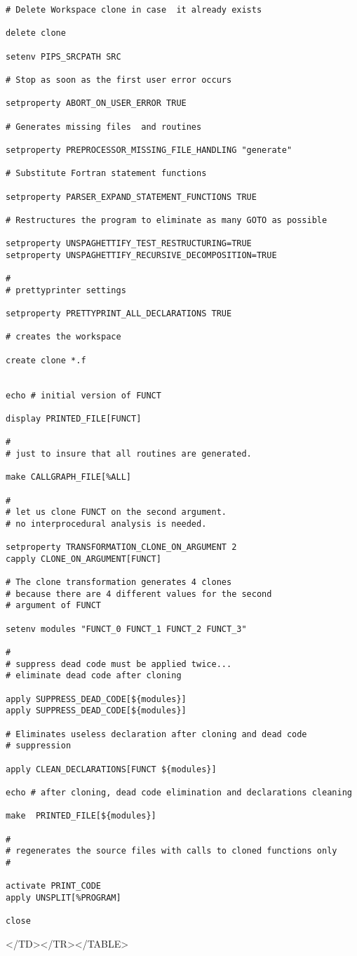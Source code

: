 \documentclass[a4paper,12pt]{article}
\begin{document}
{\bf
\begin{verbatim}
# Delete Workspace clone in case  it already exists

delete clone                      

setenv PIPS_SRCPATH SRC

# Stop as soon as the first user error occurs

setproperty ABORT_ON_USER_ERROR TRUE   

# Generates missing files  and routines 

setproperty PREPROCESSOR_MISSING_FILE_HANDLING "generate" 

# Substitute Fortran statement functions

setproperty PARSER_EXPAND_STATEMENT_FUNCTIONS TRUE

# Restructures the program to eliminate as many GOTO as possible

setproperty UNSPAGHETTIFY_TEST_RESTRUCTURING=TRUE
setproperty UNSPAGHETTIFY_RECURSIVE_DECOMPOSITION=TRUE

#
# prettyprinter settings

setproperty PRETTYPRINT_ALL_DECLARATIONS TRUE

# creates the workspace

create clone *.f


echo # initial version of FUNCT

display PRINTED_FILE[FUNCT]

#
# just to insure that all routines are generated.

make CALLGRAPH_FILE[%ALL]

#
# let us clone FUNCT on the second argument. 
# no interprocedural analysis is needed. 

setproperty TRANSFORMATION_CLONE_ON_ARGUMENT 2
capply CLONE_ON_ARGUMENT[FUNCT]

# The clone transformation generates 4 clones
# because there are 4 different values for the second
# argument of FUNCT

setenv modules "FUNCT_0 FUNCT_1 FUNCT_2 FUNCT_3"

#
# suppress dead code must be applied twice...
# eliminate dead code after cloning

apply SUPPRESS_DEAD_CODE[${modules}]
apply SUPPRESS_DEAD_CODE[${modules}]

# Eliminates useless declaration after cloning and dead code
# suppression

apply CLEAN_DECLARATIONS[FUNCT ${modules}]

echo # after cloning, dead code elimination and declarations cleaning

make  PRINTED_FILE[${modules}]

#
# regenerates the source files with calls to cloned functions only
# 

activate PRINT_CODE
apply UNSPLIT[%PROGRAM]

close 
\end{verbatim}
}
\begin{rawhtml}
</TD></TR></TABLE>
\end{rawhtml}
\end{document}
